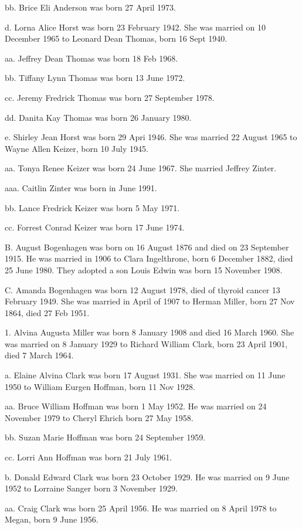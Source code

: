 \documentclass[a4paper]{article}
\begin{document}
bb. Brice Eli Anderson was born 27 April 1973.

d. Lorna Alice Horst was born 23 February 1942.  She was married on 10 December 1965 to Leonard Dean Thomas, born 16 Sept 1940.

aa. Jeffrey Dean Thomas was born 18 Feb 1968.

bb. Tiffany Lynn Thomas was born 13 June 1972.

cc. Jeremy Fredrick Thomas was born 27 September 1978.

dd. Danita Kay Thomas was born 26 January 1980.

e. Shirley Jean Horst was born 29 Apri 1946.  She was married 22 August 1965 to Wayne Allen Keizer, born 10 July 1945.

aa. Tonya Renee Keizer was born 24 June 1967. She married Jeffrey Zinter.
				 
aaa. Caitlin Zinter was born in June 1991. 

bb. Lance Fredrick Keizer was born 5 May 1971.

cc. Forrest Conrad Keizer was born 17 June 1974.

B. August Bogenhagen was born on 16 August 1876 and died on 23 September 1915. He was married in 1906 to Clara Ingelthrone, born 6 December 1882, died 25 June 1980.  They adopted a son Louis Edwin was born 15 November 1908.

C. Amanda Bogenhagen was born 12 August 1978, died of thyroid cancer 13 February 1949.  She was married in April of 1907 to Herman Miller, born 27 Nov 1864, died 27 Feb 1951.

1. Alvina Augusta Miller was born 8 January 1908 and died 16 March 1960.  She was married on 8 January 1929 to Richard William Clark, born 23 April 1901, died 7 March 1964.

a. Elaine Alvina Clark was born 17 August 1931.  She was married on 11 June 1950 to William Eurgen Hoffman, born 11 Nov 1928.

aa. Bruce William Hoffman was born 1 May 1952.  He was married on 24 November 1979 to Cheryl Ehrich born 27 May 1958.

bb. Suzan Marie Hoffman was born 24 September 1959.

cc. Lorri Ann Hoffman was born 21 July 1961.

b. Donald Edward Clark was born 23 October 1929.  He was married on 9 June 1952 to Lorraine Sanger born 3 November 1929.
 
aa. Craig Clark was born 25 April 1956.  He was married on 8 April 1978 to Megan, born 9 June 1956.
				
\end{document}
